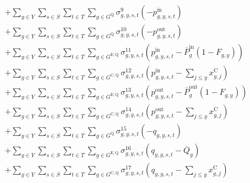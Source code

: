 \documentclass{article}
\newcommand{\sStorage}{G^{\mathrm{Q}}}
\newcommand{\sStorageExisting}{G^{\mathrm{E,Q}}}
\newcommand{\sStorageCandidate}{G^{\mathrm{C,Q}}}
\newcommand{\sYears}{Y}
\newcommand{\sScenarios}{S}
\newcommand{\sIntervals}{T}
\newcommand{\iGenerator}{g}
\newcommand{\iYear}{y}
\newcommand{\iYearAlias}{j}
\newcommand{\iScenario}{s}
\newcommand{\iInterval}{t}
\newcommand{\cPowerChargingMax}[1][\iGenerator]{\overline{P}^{\mathrm{in}}_{#1}}
\newcommand{\cPowerDischargingMax}[1][\iGenerator]{\overline{P}^{\mathrm{out}}_{#1}}
\newcommand{\cStorageUnitEnergyMax}[1][\iGenerator]{\overline{Q}_{#1}}
\newcommand{\cRetirementIndicator}[1][\iGenerator,\iYear]{F_{#1}}
\newcommand{\vInstalledCapacity}[1][\iGenerator,\iYear]{x^{\mathrm{C}}_{#1}}
\newcommand{\vPowerIn}[1][\iGenerator,\iYear,\iScenario,\iInterval]{p^{\mathrm{in}}_{#1}}
\newcommand{\vPowerOut}[1][\iGenerator,\iYear,\iScenario,\iInterval]{p^{\mathrm{out}}_{#1}}
\newcommand{\vStorageUnitEnergy}[1][\iGenerator,\iYear,\iScenario,\iInterval]{q_{#1}}
\newcommand{\dNonNegativeCharging}[1][\iGenerator,\iYear,\iScenario,\iInterval]{\sigma_{#1}^{9}}
\newcommand{\dNonNegativeDischarging}[1][\iGenerator,\iYear,\iScenario,\iInterval]{\sigma_{#1}^{10}}
\newcommand{\dMaxChargingRateExisting}[1][\iGenerator,\iYear,\iScenario,\iInterval]{\sigma_{#1}^{11}}
\newcommand{\dMaxChargingRateCandidate}[1][\iGenerator,\iYear,\iScenario,\iInterval]{\sigma_{#1}^{12}}
\newcommand{\dMaxDischargingRateExisting}[1][\iGenerator,\iYear,\iScenario,\iInterval]{\sigma_{#1}^{13}}
\newcommand{\dMaxDischargingRateCandidate}[1][\iGenerator,\iYear,\iScenario,\iInterval]{\sigma_{#1}^{14}}
\newcommand{\dNonNegativeStorageEnergy}[1][\iGenerator,\iYear,\iScenario,\iInterval]{\sigma_{#1}^{15}}
\newcommand{\dMaxStorageEnergyExisting}[1][\iGenerator,\iYear,\iScenario,\iInterval]{\sigma_{#1}^{16}}
\newcommand{\dMaxStorageEnergyCandidate}[1][\iGenerator,\iYear,\iScenario,\iInterval]{\sigma_{#1}^{17}}
\begin{document}
\begin{align}
		& + \sum\limits_{\iYear \in \sYears}\sum\limits_{\iScenario \in \sScenarios}\sum\limits_{\iInterval \in \sIntervals} \sum\limits_{\iGenerator \in \sStorage} \dNonNegativeCharging \left(-\vPowerIn\right)\\
		& + \sum\limits_{\iYear \in \sYears}\sum\limits_{\iScenario \in \sScenarios}\sum\limits_{\iInterval \in \sIntervals} \sum\limits_{\iGenerator \in \sStorage} \dNonNegativeDischarging \left(-\vPowerOut\right)\\
		& + \sum\limits_{\iYear \in \sYears}\sum\limits_{\iScenario \in \sScenarios}\sum\limits_{\iInterval \in \sIntervals} \sum\limits_{\iGenerator \in \sStorageExisting} \dMaxChargingRateExisting \left(\vPowerIn - \cPowerChargingMax \left(1 - \cRetirementIndicator\right) \right)\\
		& + \sum\limits_{\iYear \in \sYears}\sum\limits_{\iScenario \in \sScenarios}\sum\limits_{\iInterval \in \sIntervals} \sum\limits_{\iGenerator \in \sStorageCandidate} \dMaxChargingRateCandidate \left(\vPowerIn - \sum\limits_{\iYearAlias \leq \iYear} \vInstalledCapacity[\iGenerator,\iYearAlias]\right)\\
		& + \sum\limits_{\iYear \in \sYears}\sum\limits_{\iScenario \in \sScenarios}\sum\limits_{\iInterval \in \sIntervals} \sum\limits_{\iGenerator \in \sStorageExisting} \dMaxDischargingRateExisting \left(\vPowerOut - \cPowerDischargingMax \left(1 - \cRetirementIndicator\right)\right)\\
		& + \sum\limits_{\iYear \in \sYears}\sum\limits_{\iScenario \in \sScenarios}\sum\limits_{\iInterval \in \sIntervals} \sum\limits_{\iGenerator \in \sStorageCandidate} \dMaxDischargingRateCandidate \left(\vPowerOut - \sum\limits_{\iYearAlias \leq \iYear} \vInstalledCapacity[\iGenerator,\iYearAlias]\right)\\
		& + \sum\limits_{\iYear \in \sYears}\sum\limits_{\iScenario \in \sScenarios}\sum\limits_{\iInterval \in \sIntervals} \sum\limits_{\iGenerator \in \sStorage} \dNonNegativeStorageEnergy \left(- \vStorageUnitEnergy\right)\\
		& + \sum\limits_{\iYear \in \sYears}\sum\limits_{\iScenario \in \sScenarios}\sum\limits_{\iInterval \in \sIntervals} \sum\limits_{\iGenerator \in \sStorageExisting} \dMaxStorageEnergyExisting \left(\vStorageUnitEnergy - \cStorageUnitEnergyMax\right)\\
		& + \sum\limits_{\iYear \in \sYears}\sum\limits_{\iScenario \in \sScenarios}\sum\limits_{\iInterval \in \sIntervals} \sum\limits_{\iGenerator \in \sStorageCandidate} \dMaxStorageEnergyCandidate \left(\vStorageUnitEnergy - \sum\limits_{\iYearAlias \leq \iYear} \vInstalledCapacity[\iGenerator,\iYearAlias]\right)\\

\end{align}
\end{document}
